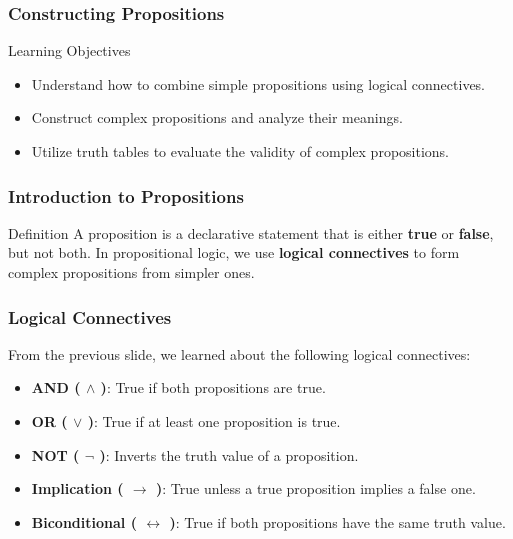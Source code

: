 \documentclass[aspectratio=169]{beamer}
\begin{document}
\begin{frame}[fragile]
    \frametitle{Constructing Propositions}
    \begin{block}{Learning Objectives}
        \begin{itemize}
            \item Understand how to combine simple propositions using logical connectives.
            \item Construct complex propositions and analyze their meanings.
            \item Utilize truth tables to evaluate the validity of complex propositions.
        \end{itemize}
    \end{block}
\end{frame}

\begin{frame}[fragile]
    \frametitle{Introduction to Propositions}
    \begin{block}{Definition}
        A proposition is a declarative statement that is either \textbf{true} or \textbf{false}, but not both. In propositional logic, we use \textbf{logical connectives} to form complex propositions from simpler ones.
    \end{block}
\end{frame}

\begin{frame}[fragile]
    \frametitle{Logical Connectives}
    From the previous slide, we learned about the following logical connectives:
    \begin{itemize}
        \item \textbf{AND ( $\land$ )}: True if both propositions are true.
        \item \textbf{OR ( $\lor$ )}: True if at least one proposition is true.
        \item \textbf{NOT ( $\neg$ )}: Inverts the truth value of a proposition.
        \item \textbf{Implication ( $\to$ )}: True unless a true proposition implies a false one.
        \item \textbf{Biconditional ( $\leftrightarrow$ )}: True if both propositions have the same truth value.
    \end{itemize}
\end{frame}
\end{document}
